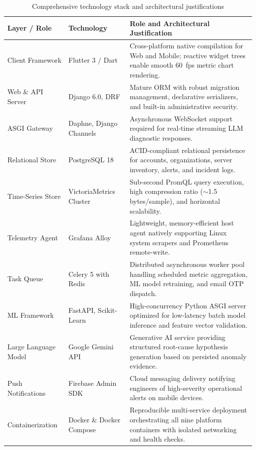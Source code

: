 \begin{table}[H]
\centering
\small
\caption{Comprehensive technology stack and architectural justifications}\label{tab:stack}
\begin{tabularx}{\textwidth}{p{} p{} X}
\toprule
\textbf{Layer / Role} & \textbf{Technology} & \textbf{Role and Architectural Justification}\\
\midrule
Client Framework & Flutter 3 / Dart & Cross-platform native compilation for Web and Mobile; reactive widget trees enable smooth 60~fps metric chart rendering.\\
Web \& API Server & Django 6.0, DRF & Mature ORM with robust migration management, declarative serializers, and built-in administrative security.\\
ASGI Gateway & Daphne, Django Channels & Asynchronous WebSocket support required for real-time streaming LLM diagnostic responses.\\
Relational Store & PostgreSQL 18 & ACID-compliant relational persistence for accounts, organizations, server inventory, alerts, and incident logs.\\
Time-Series Store & VictoriaMetrics Cluster & Sub-second PromQL query execution, high compression ratio ($\sim$1.5 bytes/sample), and horizontal scalability.\\
Telemetry Agent & Grafana Alloy & Lightweight, memory-efficient host agent natively supporting Linux system scrapers and Prometheus remote-write.\\
Task Queue & Celery 5 with Redis & Distributed asynchronous worker pool handling scheduled metric aggregation, ML model retraining, and email OTP dispatch.\\
ML Framework & FastAPI, Scikit-Learn & High-concurrency Python ASGI server optimized for low-latency batch model inference and feature vector validation.\\
Large Language Model & Google Gemini API & Generative AI service providing structured root-cause hypothesis generation based on persisted anomaly evidence.\\
Push Notifications & Firebase Admin SDK & Cloud messaging delivery notifying engineers of high-severity operational alerts on mobile devices.\\
Containerization & Docker \& Docker Compose & Reproducible multi-service deployment orchestrating all nine platform containers with isolated networking and health checks.\\
\bottomrule
\end{tabularx}
\end{table}

